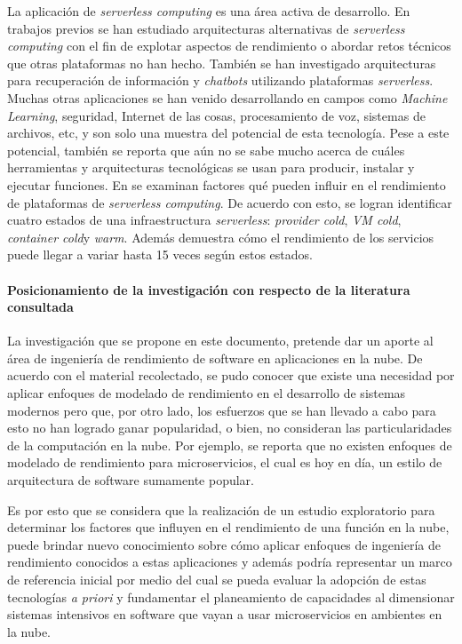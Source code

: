 La aplicación de \emph{serverless computing} es una área activa de desarrollo. En trabajos previos \cite{7979855,hendrickson2016serverless} se han estudiado arquitecturas alternativas de \emph{serverless computing} con el fin de explotar aspectos de rendimiento o abordar retos técnicos que otras plataformas no han hecho. También se han investigado arquitecturas para recuperación de información\cite{Crane:2017:ESA:3121050.3121086} y \emph{chatbots}\cite{Yan:2016:BCS:3007203.3007217} utilizando plataformas \emph{serverless}. Muchas otras aplicaciones se han venido desarrollando en campos como \emph{Machine Learning}, seguridad, Internet de las cosas, procesamiento de voz, sistemas de archivos, etc, y son solo una muestra del potencial de esta tecnología. Pese a este potencial, también se reporta que aún no se sabe mucho acerca de cuáles herramientas y arquitecturas tecnológicas se usan para producir, instalar y ejecutar funciones\cite{Spillner:2017:PTS:3147213.3149452}. En \cite{8360324} se examinan factores qué pueden influir en el rendimiento de plataformas de \emph{serverless computing}. De acuerdo con esto, se logran identificar cuatro estados de una infraestructura \emph{serverless}: \emph{provider cold}, \emph{VM cold}, \emph{container cold}y \emph{warm}. Además demuestra cómo el rendimiento de los servicios puede llegar a variar hasta 15 veces según estos estados.

\paragraph{Posicionamiento de la investigación con respecto de la literatura consultada}
La investigación que se propone en este documento, pretende dar un aporte al área de ingeniería de rendimiento de software en aplicaciones en la nube. De acuerdo con el material recolectado, se pudo conocer que existe una necesidad por aplicar enfoques de modelado de rendimiento en el desarrollo de sistemas modernos pero que, por otro lado, los esfuerzos que se han llevado a cabo para esto no han logrado ganar popularidad, o bien, no consideran las particularidades de la computación en la nube. Por ejemplo, se reporta que no existen enfoques de modelado de rendimiento para microservicios, el cual es hoy en día, un estilo de arquitectura de software sumamente popular.

Es por esto que se considera que la realización de un estudio exploratorio para determinar los factores que influyen en el rendimiento de una función en la nube, puede brindar nuevo conocimiento sobre cómo aplicar enfoques de ingeniería de rendimiento conocidos a estas aplicaciones y además podría representar un marco de referencia inicial por medio del cual se pueda evaluar la adopción de estas tecnologías \emph{a priori} y fundamentar el planeamiento de capacidades al dimensionar sistemas intensivos en software que vayan a usar microservicios en ambientes en la nube.

